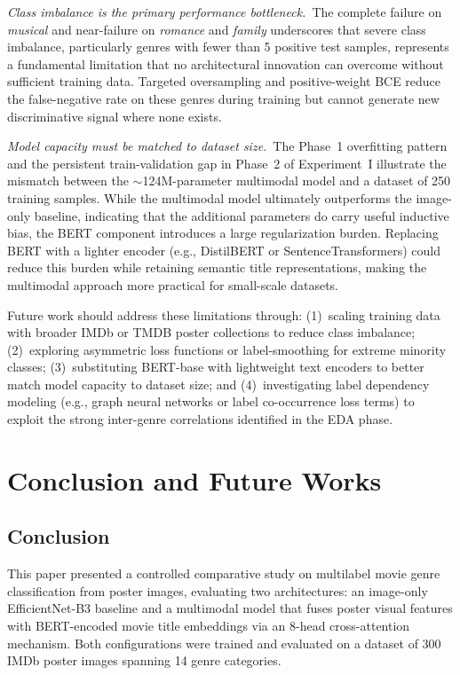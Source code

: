 \documentclass[conference]{IEEEtran}
\begin{document}
\textit{Class imbalance is the primary performance bottleneck.}\
The complete failure on \textit{musical} and near-failure on
\textit{romance} and \textit{family} underscores that severe
class imbalance, particularly genres with fewer than 5 positive
test samples, represents a fundamental limitation that no
architectural innovation can overcome without sufficient training
data. Targeted oversampling and positive-weight BCE reduce the
false-negative rate on these genres during training but cannot
generate new discriminative signal where none exists.

\textit{Model capacity must be matched to dataset size.}\
The Phase~1 overfitting pattern and the persistent
train-validation gap in Phase~2 of Experiment~I illustrate the
mismatch between the $\sim$124M-parameter multimodal model and a
dataset of 250 training samples. While the multimodal model
ultimately outperforms the image-only baseline, indicating that
the additional parameters do carry useful inductive bias, the
BERT component introduces a large regularization burden.
Replacing BERT with a lighter encoder (e.g., DistilBERT or
SentenceTransformers) could reduce this burden while retaining
semantic title representations, making the multimodal approach
more practical for small-scale datasets.

Future work should address these limitations through:
(1)~scaling training data with broader IMDb or TMDB poster
collections to reduce class imbalance; (2)~exploring asymmetric
loss functions or label-smoothing for extreme minority classes;
(3)~substituting BERT-base with lightweight text encoders to
better match model capacity to dataset size; and
(4)~investigating label dependency modeling (e.g., graph neural
networks or label co-occurrence loss terms) to exploit the strong
inter-genre correlations identified in the EDA phase.
\section{Conclusion and Future Works}
\label{sec:conclusion}

\subsection{Conclusion}

This paper presented a controlled comparative study on multilabel 
movie genre classification from poster images, evaluating two 
architectures: an image-only EfficientNet-B3 baseline and a 
multimodal model that fuses poster visual features with 
BERT-encoded movie title embeddings via an 8-head cross-attention 
mechanism. Both configurations were trained and evaluated on a 
dataset of 300 IMDb poster images spanning 14 genre categories.
\end{document}
